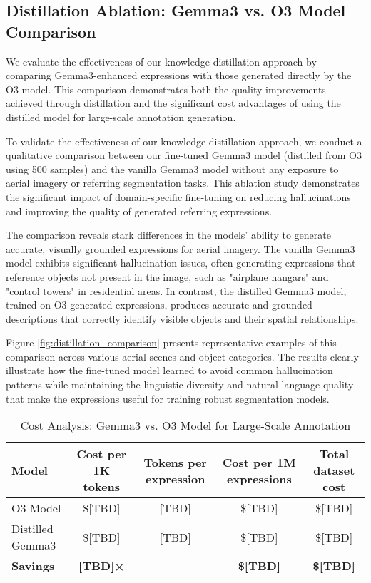 \subsection{Distillation Ablation: Gemma3 vs. O3 Model Comparison}
\label{subsec:distillation_ablation}

We evaluate the effectiveness of our knowledge distillation approach by comparing Gemma3-enhanced expressions with those generated directly by the O3 model. This comparison demonstrates both the quality improvements achieved through distillation and the significant cost advantages of using the distilled model for large-scale annotation generation.

To validate the effectiveness of our knowledge distillation approach, we conduct a qualitative comparison between our fine-tuned Gemma3 model (distilled from O3 using 500 samples) and the vanilla Gemma3 model without any exposure to aerial imagery or referring segmentation tasks. This ablation study demonstrates the significant impact of domain-specific fine-tuning on reducing hallucinations and improving the quality of generated referring expressions.

The comparison reveals stark differences in the models' ability to generate accurate, visually grounded expressions for aerial imagery. The vanilla Gemma3 model exhibits significant hallucination issues, often generating expressions that reference objects not present in the image, such as "airplane hangars" and "control towers" in residential areas. In contrast, the distilled Gemma3 model, trained on O3-generated expressions, produces accurate and grounded descriptions that correctly identify visible objects and their spatial relationships.

Figure \ref{fig:distillation_comparison} presents representative examples of this comparison across various aerial scenes and object categories. The results clearly illustrate how the fine-tuned model learned to avoid common hallucination patterns while maintaining the linguistic diversity and natural language quality that make the expressions useful for training robust segmentation models.

\begin{table*}[t]
\centering
\caption{Cost Analysis: Gemma3 vs. O3 Model for Large-Scale Annotation}
\label{tab:cost_comparison}
\begin{tabular}{@{}lcccc@{}}
\toprule
\textbf{Model} & \textbf{Cost per 1K tokens} & \textbf{Tokens per expression} & \textbf{Cost per 1M expressions} & \textbf{Total dataset cost} \\
\midrule
O3 Model & \$[TBD] & [TBD] & \$[TBD] & \$[TBD] \\
Distilled Gemma3 & \$[TBD] & [TBD] & \$[TBD] & \$[TBD] \\
\midrule
\textbf{Savings} & \textbf{[TBD]×} & \textbf{--} & \textbf{\$[TBD]} & \textbf{\$[TBD]} \\
\bottomrule
\end{tabular}
\end{table*}

